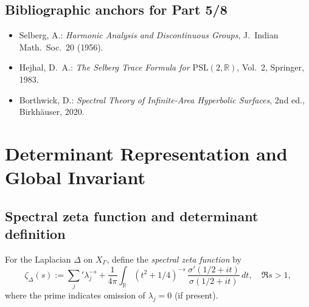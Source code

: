 \subsection{Bibliographic anchors for Part 5/8}
\label{subsec:ch4-part5-bib-anchors} \relax

\begin{itemize}
  \item Selberg, A.: \emph{Harmonic Analysis and Discontinuous Groups}, J.\ Indian Math.\ Soc.\ 20 (1956). %
  \item Hejhal, D.~A.: \emph{The Selberg Trace Formula for $\mathrm{PSL}(2,\mathbb{R})$}, Vol.~2, Springer, 1983. %
  \item Borthwick, D.: \emph{Spectral Theory of Infinite-Area Hyperbolic Surfaces}, 2nd ed., Birkhäuser, 2020. %
\end{itemize}


\section{Determinant Representation and Global Invariant}
\label{sec:ch4-part6-det-rep} \relax \hspace{0pt}

\subsection{Spectral zeta function and determinant definition}
\label{subsec:ch4-part6-zeta-det} \relax

\begin{definition}
\label{def:spectral-zeta}
For the Laplacian $\Delta$ on $X_\Gamma$, define the \emph{spectral zeta function} by
\[
\zeta_\Delta(s)
:= \sum_{j}' \lambda_j^{-s}
+ \frac{1}{4\pi}\int_{\mathbb{R}} (t^2+1/4)^{-s}\,
\frac{\sigma'(1/2+it)}{\sigma(1/2+it)}\,dt,
\quad \Re s>1,
\]
where the prime indicates omission of $\lambda_j=0$ (if present). \relax
\end{definition}

